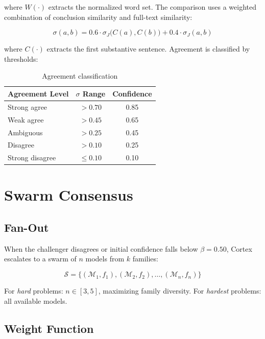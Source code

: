 \documentclass[11pt, a4paper, twocolumn]{article}
\newcommand{\model}{\mathcal{M}}
\begin{document}
where $W(\cdot)$ extracts the normalized word set. The comparison uses a weighted combination of conclusion similarity and full-text similarity:

\begin{equation}
    \sigma(a, b) = 0.6 \cdot \sigma_J\!\bigl(C(a), C(b)\bigr) + 0.4 \cdot \sigma_J(a, b)
\end{equation}

where $C(\cdot)$ extracts the first substantive sentence. Agreement is classified by thresholds:

\begin{table}[H]
\centering
\caption{Agreement classification}
\small
\begin{tabular}{@{}lcc@{}}
\toprule
Agreement Level & $\sigma$ Range & Confidence \\
\midrule
Strong agree & $> 0.70$ & 0.85 \\
Weak agree & $> 0.45$ & 0.65 \\
Ambiguous & $> 0.25$ & 0.45 \\
Disagree & $> 0.10$ & 0.25 \\
Strong disagree & $\leq 0.10$ & 0.10 \\
\bottomrule
\end{tabular}
\end{table}

\section{Swarm Consensus}

\subsection{Fan-Out}

When the challenger disagrees or initial confidence falls below $\beta = 0.50$, Cortex escalates to a swarm of $n$ models from $k$ families:

\begin{equation}
    \mathcal{S} = \{(\model_1, f_1), (\model_2, f_2), \ldots, (\model_n, f_n)\}
\end{equation}

For \textit{hard} problems: $n \in [3, 5]$, maximizing family diversity. For \textit{hardest} problems: all available models.

\subsection{Weight Function}
\end{document}
